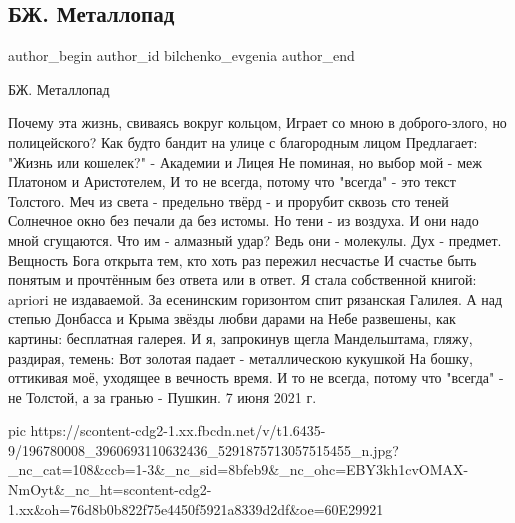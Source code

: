  
 
 
 
 
 
\subsection{БЖ. Металлопад}
\label{sec:07_06_2021.fb.bilchenko_evgenia.6.metallopad}
\ifcmt
 author_begin
   author_id bilchenko_evgenia
 author_end
\fi

БЖ. Металлопад

Почему эта жизнь, свиваясь вокруг кольцом,
Играет со мною в доброго-злого, но полицейского?
Как будто бандит на улице с благородным лицом
Предлагает: "Жизнь или кошелек?" - Академии и Лицея
Не поминая, но выбор мой - меж Платоном и Аристотелем,
И то не всегда, потому что "всегда" - это текст Толстого.
Меч из света - предельно твёрд - и прорубит сквозь сто теней
Солнечное окно без печали да без истомы.
Но тени - из воздуха. И они надо мной сгущаются.
Что им - алмазный удар? Ведь они - молекулы. Дух - предмет.
Вещность Бога открыта тем, кто хоть раз пережил несчастье
И счастье быть понятым и прочтённым без ответа или в ответ.
Я стала собственной книгой: apriori не издаваемой.
За есенинским горизонтом спит рязанская Галилея.
А над степью Донбасса и Крыма звёзды любви дарами на
Небе развешены, как картины: бесплатная галерея.
И я, запрокинув щегла Мандельштама, гляжу, раздирая, темень:
Вот золотая  падает - металлическою кукушкой
На бошку, оттикивая моё, уходящее в вечность время.
И то не всегда, потому что "всегда" - не Толстой, а за гранью - Пушкин.
7 июня 2021 г.

\ifcmt
  pic https://scontent-cdg2-1.xx.fbcdn.net/v/t1.6435-9/196780008_3960693110632436_5291875713057515455_n.jpg?_nc_cat=108&ccb=1-3&_nc_sid=8bfeb9&_nc_ohc=EBY3kh1cvOMAX-NmOyt&_nc_ht=scontent-cdg2-1.xx&oh=76d8b0b822f75e4450f5921a8339d2df&oe=60E29921
\fi

